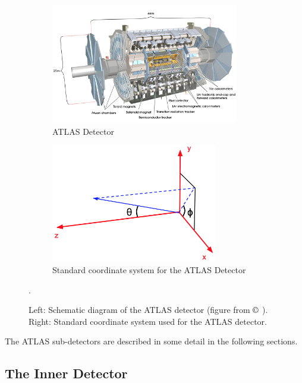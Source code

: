 \begin{figure}[H]
	\centering
	\begin{subfigure}[b]{0.45\textwidth}
	\includegraphics[width=0.9\textwidth]{Figures/3/detector.jpg}
	\caption{ATLAS Detector}
	\label{fig:detector}
	\end{subfigure}
	\begin{subfigure}[b]{0.45\textwidth}
	\includegraphics[width=0.8\textwidth]{Figures/3/ATLAS_coordinate_system.png}
	\caption{Standard coordinate system for the ATLAS Detector}
	\label{fig:coord_system}
	\end{subfigure}
	\caption[]{Left: Schematic diagram of the ATLAS detector (figure from $\copyright$ \cite{atlas}). Right: Standard coordinate system used for the ATLAS detector.}.
	\label{fig:detector}
\end{figure}

The ATLAS sub-detectors are described in some detail in the following sections.

\subsection{The Inner Detector}

